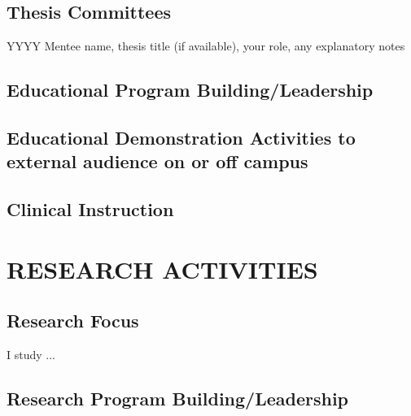 \documentclass[11pt]{article}
\newenvironment{lyxlist}[1]
	{\begin{list}{}
		{\setlength\itemsep{-0.5ex}
		\settowidth{\labelwidth}{#1}
		 \setlength{\leftmargin}{\labelwidth}
		 \addtolength{\leftmargin}{\labelsep}
		 \renewcommand{\makelabel}[1]{##1\hfil}}}
	{\end{list}}
\begin{document}
\subsection*{Thesis Committees}
\begin{lyxlist}{20{*}{*}\textendash 20{*}{*}} %
\item[{YYYY}]Mentee name, thesis title (if available), your role, any explanatory notes
\end{lyxlist}

\subsection*{Educational Program Building/Leadership \ {}} 

\subsection*{Educational Demonstration Activities to external audience on or off campus \ {}} 

\subsection*{Clinical Instruction \ {}} 

\section*{RESEARCH ACTIVITIES}

\subsection*{Research Focus}
I study ...

\subsection*{Research Program Building/Leadership}
\end{document}
